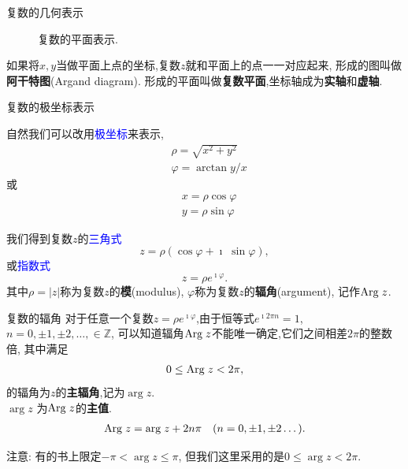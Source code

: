 \documentclass[fontset=windows, chinese, 10pt]{beamer}
\newcommand{\blue}[1]{\textcolor{blue}{#1}}
\begin{document}
  \begin{frame}{复数的几何表示}
    \begin{figure}
      \centering
      \scalebox{1.0}{
        
        }
        \caption{复数的平面表示.} \label{fig:complex_plane}
  \end{figure}
如果将$x,y$当做平面上点的坐标,复数$z$就和平面上的点一一对应起来,
形成的图叫做\textbf{阿干特图}(Argand diagram).
形成的平面叫做{\bf 复数平面},坐标轴成为{\bf 实轴}和{\bf 虚轴}.

\end{frame}

  \begin{frame}{复数的极坐标表示}
    \begin{figure}
        \scalebox{1.0}{
          
          }
    \end{figure}
    自然我们可以改用\blue{极坐标}来表示,
      \begin{align}
          & \rho = \sqrt{x^2 + y^2}\\
          & \varphi = \arctan y/x
      \end{align}
      或
      \begin{align}
          & x = \rho \cos\varphi \\
          & y = \rho \sin\varphi 
      \end{align}
      
      我们得到复数$z$的\blue{三角式}
      \begin{equation}
          z = \rho (\cos\varphi +  \imath\; \sin\varphi) ,
      \end{equation}
      或\blue{指数式}
      \begin{equation}
          z = \rho e^{\imath \varphi} .
      \end{equation}
      其中$\rho = | z| $称为复数$z$的\textbf{模}(modulus), $\varphi$称为复数$z$的\textbf{辐角}(argument), 记作${\mathrm{Arg}\;} z$.
\end{frame}

\begin{frame}{复数的辐角}
  对于任意一个复数$z=\rho e^{\imath \varphi}$,由于恒等式$e^{\imath 2\pi n} = 1$, $n = 0, \pm 1, \pm 2, \dots, \in \mathbb{Z}$,
可以知道辐角${\mathrm{Arg}\;} z$不能唯一确定,它们之间相差$2\pi$的整数倍,
其中满足
\begin{align}
    0 \leq {\mathrm{Arg}\;} z < 2\pi ,
\end{align}
的辐角为$z$的\textbf{主辐角},记为$\arg z$. \\$\arg z$ 为${\mathrm{Arg}\;} z$的\textbf{主值}.
\begin{align}
    {\mathrm{Arg}\;} z = {\mathrm{arg}\;} z + 2 n \pi \quad (n = 0, \pm 1, \pm 2\dots).
\end{align}
\begin{alertblock}{注意: }%
  { 有的书上限定$-\pi < \arg z \leq \pi$, 但我们这里采用的是$0 \leq \arg z < 2\pi$.}
\end{alertblock}

\end{frame}
\end{document}
